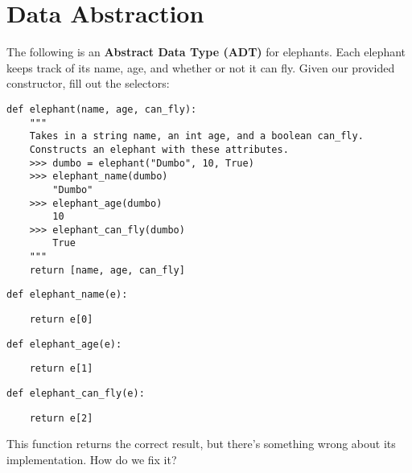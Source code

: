 \documentclass{exam}
\begin{document}
\section{Data Abstraction}
\begin{questions}


\begin{blocksection}
\question The following is an \textbf{Abstract Data Type (ADT)} for elephants.
Each elephant keeps track of its name, age, and whether or not it can fly. Given
our provided constructor, fill out the selectors:

\begin{lstlisting}
def elephant(name, age, can_fly):
    """
    Takes in a string name, an int age, and a boolean can_fly.
    Constructs an elephant with these attributes.
    >>> dumbo = elephant("Dumbo", 10, True)
    >>> elephant_name(dumbo)
        "Dumbo"
    >>> elephant_age(dumbo)
        10
    >>> elephant_can_fly(dumbo)
        True
    """
    return [name, age, can_fly]
\end{lstlisting}

\begin{lstlisting}
def elephant_name(e):
\end{lstlisting}
\begin{solution}[1in]
\begin{lstlisting}
    return e[0]
\end{lstlisting}
\end{solution}

\begin{lstlisting}
def elephant_age(e):
\end{lstlisting}
\begin{solution}[1in]
\begin{lstlisting}
    return e[1]
\end{lstlisting}
\end{solution}

\begin{lstlisting}
def elephant_can_fly(e):
\end{lstlisting}
\begin{solution}[1in]
\begin{lstlisting}
    return e[2]
\end{lstlisting}
\end{solution}
\end{blocksection}


\begin{blocksection}
\question This function returns the correct result, but there's something wrong
about its implementation. How do we fix it?


\end{blocksection}
\end{questions}
\end{document}

